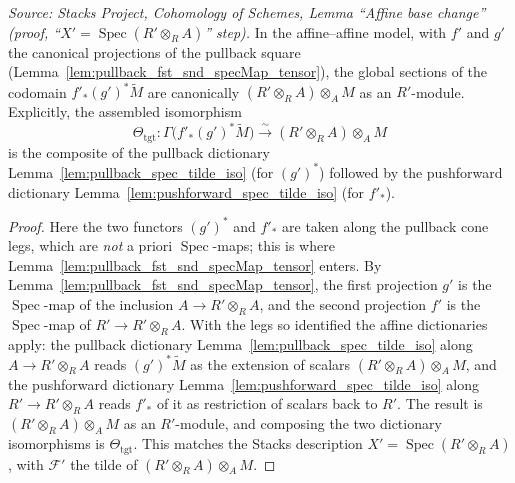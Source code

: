 \begin{lemma}




  \label{lem:base_change_mate_codomain_read}
  \textit{Source: Stacks Project, Cohomology of Schemes, Lemma ``Affine base
  change'' (proof, ``\(X' = \operatorname{Spec}(R' \otimes_R A)\)'' step).}
  In the affine--affine model, with \(f'\) and \(g'\) the canonical projections of the
  pullback square (Lemma~\ref{lem:pullback_fst_snd_specMap_tensor}), the global
  sections of the codomain \(f'_*(g')^*\widetilde M\) are canonically
  \((R' \otimes_R A) \otimes_A M\) as an \(R'\)-module. Explicitly, the assembled
  isomorphism
  \[
    \Theta_{\mathrm{tgt}} :
    \Gamma\bigl(f'_*(g')^*\widetilde M\bigr)
    \xrightarrow{\ \sim\ } (R' \otimes_R A) \otimes_A M
  \]
  is the composite of the pullback dictionary Lemma~\ref{lem:pullback_spec_tilde_iso}
  (for \((g')^*\)) followed by the pushforward dictionary
  Lemma~\ref{lem:pushforward_spec_tilde_iso} (for \(f'_*\)).
\end{lemma}

\begin{proof}
  Here the two functors \((g')^*\) and \(f'_*\) are taken along the pullback cone legs,
  which are \emph{not} a priori \(\operatorname{Spec}\)-maps; this is where
  Lemma~\ref{lem:pullback_fst_snd_specMap_tensor} enters. By
  Lemma~\ref{lem:pullback_fst_snd_specMap_tensor}, the first projection \(g'\) is the
  \(\operatorname{Spec}\)-map of the inclusion \(A \to R' \otimes_R A\), and the second
  projection \(f'\) is the \(\operatorname{Spec}\)-map of \(R' \to R' \otimes_R A\).
  With the legs so identified the affine dictionaries apply:
  the pullback dictionary Lemma~\ref{lem:pullback_spec_tilde_iso} along
  \(A \to R' \otimes_R A\) reads \((g')^*\widetilde M\) as the extension of scalars
  \((R' \otimes_R A) \otimes_A M\), and the pushforward dictionary
  Lemma~\ref{lem:pushforward_spec_tilde_iso} along \(R' \to R' \otimes_R A\) reads
  \(f'_*\) of it as restriction of scalars back to \(R'\). The result is
  \((R' \otimes_R A) \otimes_A M\) as an \(R'\)-module, and composing the two dictionary
  isomorphisms is \(\Theta_{\mathrm{tgt}}\). This matches the Stacks description
  \(X' = \operatorname{Spec}(R' \otimes_R A)\), with \(\mathcal{F}'\) the tilde of
  \((R' \otimes_R A) \otimes_A M\).
\end{proof}


